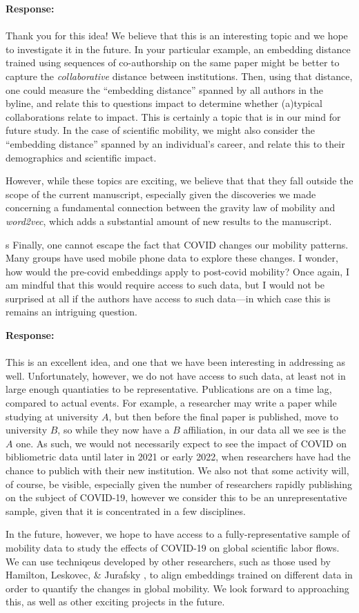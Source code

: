 \documentclass[12pt,a4paper]{article}
\newcounter{comment}[subsection]
\newcommand{\response}[1]{{\noindent \textbf{Response:} \\ \\ \noindent #1}}
\newcommand{\rcomment}[1]{%
\vspace{10pt}
\begin{sectionbox}
s #1
\end{sectionbox}
}
\begin{document}
\response{Thank you for this idea!
	We believe that this is an interesting topic and we hope to investigate it in the future.
	In your particular example, an embedding distance trained using sequences of co-authorship on the same paper might be better to capture the \textit{collaborative} distance between institutions.
	Then, using that distance, one could measure the ``embedding distance'' spanned by all authors in the byline, and relate this to questions impact to determine whether (a)typical collaborations relate to impact.
	This is certainly a topic that is in our mind for future study.
	In the case of scientific mobility, we might also consider the ``embedding distance'' spanned by an individual's career, and relate this to their demographics and scientific impact.

	However, while these topics are exciting, we believe that that they fall outside the scope of the current manuscript, especially given the discoveries we made concerning a fundamental connection between the gravity law of mobility and \textit{word2vec}, which adds a substantial amount of new results to the manuscript.
}


\rcomment{
	Finally, one cannot escape the fact that COVID changes our mobility patterns. Many groups have used mobile phone data to explore these changes. I wonder, how would the pre-covid embeddings apply to post-covid mobility? Once again, I am mindful that this would require access to such data, but I would not be surprised at all if the authors have access to such data—in which case this is remains an intriguing question.
}

\response{This is an excellent idea, and one that we have been interesting in addressing as well.
	Unfortunately, however, we do not have access to such data, at least not in large enough quantiaties to be representative.
	Publications are on a time lag, compared to actual events.
	For example, a researcher may write a paper while studying at university $A$, but then before the final paper is published, move to university $B$, so while they now have a $B$ affiliation, in our data all we see is the $A$ one.
	As such, we would not necessarily expect to  see the impact of COVID on bibliometric data until later in 2021 or early 2022, when researchers have had the chance to publich with their new institution.
	We also not that some activity will, of course, be visible, especially given the number of researchers rapidly publishing on the subject of COVID-19, however we consider this to be an unrepresentative sample, given that it is concentrated in a few disciplines.

	In the future, however, we hope to have access to a fully-representative sample of mobility data to study the effects of COVID-19 on global scientific labor flows.
	We can use techniqeus developed by other researchers, such as those used by Hamilton, Leskovec, \& Jurafsky \autocite{hamilton-etal-2016-diachronic}, to align embeddings trained on different data in order to quantify the changes in global mobility.
	We look forward to approaching this, as well as other exciting projects in the future.
}
\end{document}
